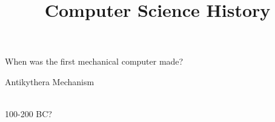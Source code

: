 \documentclass[xcolor={usenames,dvipsnames,svgnames,table},12pt]{beamer}
\title{Computer Science History}
\begin{document}

\begin{frame}
  \begin{center}
    When was the first mechanical computer made?
  \end{center}
\end{frame}

\begin{frame}{Antikythera Mechanism}
  \begin{center}
     \quad
     \\
    100-200 BC?
  \end{center}
\end{frame}
\end{document}

